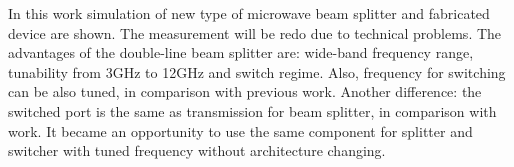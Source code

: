\documentclass[a0paper,portrait]{baposter}
\begin{document}
\begin{poster}



{\small{In this work simulation of new type of microwave beam splitter and fabricated device are shown. The measurement will be redo due to technical problems. The advantages of the double-line beam splitter are: wide-band frequency range, tunability from 3GHz to 12GHz and switch regime. Also, frequency for switching can be also tuned, in comparison with previous work\cite{pechal2016superconducting}. Another difference: the switched port is the same as transmission for beam splitter, in comparison with work\cite{pechal2016superconducting}. It became an opportunity to use the same component for splitter and switcher with tuned frequency without architecture changing.}}



\end{poster}
\end{document}
